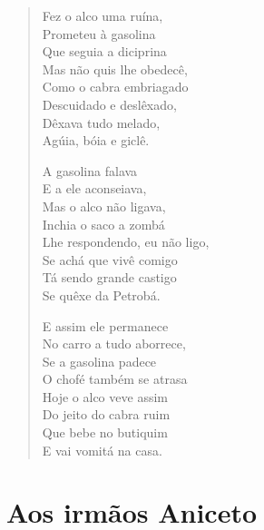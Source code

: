\begin{verse}
Fez o alco uma ruína,\\
Prometeu à gasolina\\
Que seguia a diciprina\\
Mas não quis lhe obedecê,\\
Como o cabra embriagado\\
Descuidado e deslêxado,\\
Dêxava tudo melado,\\
Agúia, bóia e giclê.

A gasolina falava\\
E a ele aconseiava,\\
Mas o alco não ligava,\\
Inchia o saco a zombá\\
Lhe respondendo, eu não ligo,\\
Se achá que vivê comigo\\
Tá sendo grande castigo\\
Se quêxe da Petrobá.

E assim ele permanece\\
No carro a tudo aborrece,\\
Se a gasolina padece\\
O chofé também se atrasa\\
Hoje o alco veve assim\\
Do jeito do cabra ruim\\
Que bebe no butiquim\\
E vai vomitá na casa.
\end{verse}

\chapter{Aos irmãos Aniceto}

